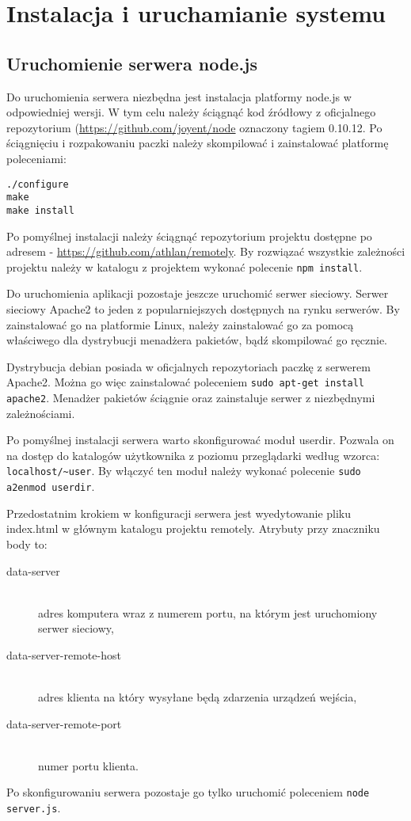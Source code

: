 \newpage
\section{Instalacja i uruchamianie systemu}

\subsection{Uruchomienie serwera node.js}
\label{subsub:setup-server-nodejs}

Do uruchomienia serwera niezbędna jest instalacja platformy node.js w odpowiedniej wersji. W tym celu należy ściągnąć kod źródłowy z oficjalnego repozytorium (\url{https://github.com/joyent/node} oznaczony tagiem 0.10.12. Po ściągnięciu i rozpakowaniu paczki należy skompilować i zainstalować platformę poleceniami:

\begin{lstlisting}
./configure
make
make install
\end{lstlisting}

Po pomyślnej instalacji należy ściągnąć repozytorium projektu dostępne po adresem - \url{https://github.com/athlan/remotely}. By rozwiązać wszystkie zależności projektu należy w katalogu z projektem wykonać polecenie \lstinline{npm install}.
\par
Do uruchomienia aplikacji pozostaje jeszcze uruchomić serwer sieciowy.
Serwer sieciowy Apache2 to jeden z popularniejszych dostępnych na rynku serwerów. By zainstalować go na platformie Linux, należy zainstalować go za pomocą właściwego dla dystrybucji menadżera pakietów, bądź skompilować go ręcznie. 
\par
Dystrybucja debian posiada w oficjalnych repozytoriach paczkę z serwerem Apache2. Można go więc zainstalować poleceniem \lstinline{sudo apt-get install apache2}. Menadżer pakietów ściągnie oraz zainstaluje serwer z niezbędnymi zależnościami.
\par
Po pomyślnej instalacji serwera warto skonfigurować moduł userdir. Pozwala on na dostęp do katalogów użytkownika z poziomu przeglądarki według wzorca: \lstinline{localhost/~user}. By włączyć ten moduł należy wykonać polecenie \lstinline{sudo a2enmod userdir}.

\par
Przedostatnim krokiem w konfiguracji serwera jest wyedytowanie pliku index.html w głównym katalogu projektu remotely. Atrybuty przy znaczniku body to:
\begin{description}
	\item[data-server] \hfill \\
		adres komputera wraz z numerem portu, na którym jest uruchomiony serwer sieciowy,
	\item[data-server-remote-host] \hfill \\
		adres klienta na który wysyłane będą zdarzenia urządzeń wejścia,
	\item[data-server-remote-port] \hfill \\
		numer portu klienta.
\end{description}
\par
Po skonfigurowaniu serwera pozostaje go tylko uruchomić poleceniem \lstinline{node server.js}.


